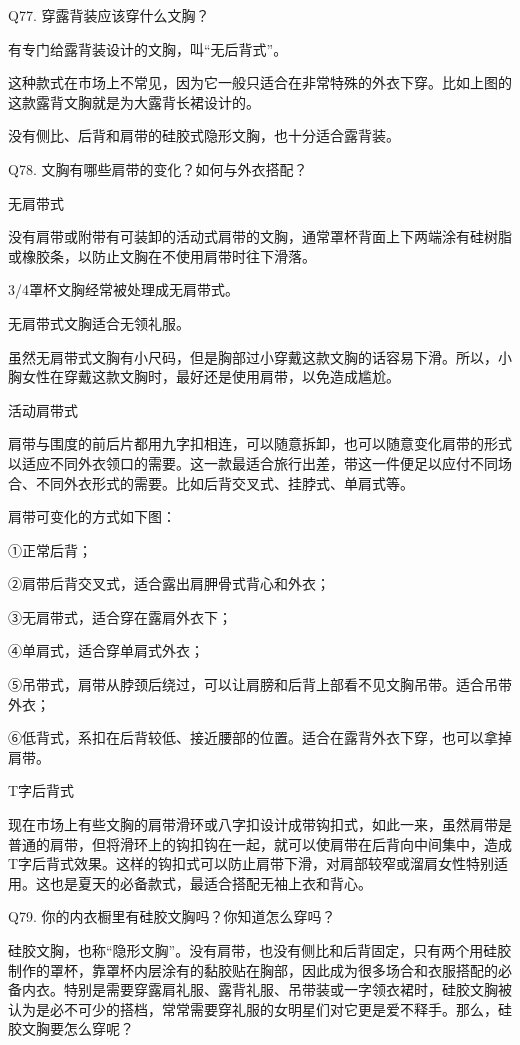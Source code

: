 \documentclass[12pt,UTF8]{ctexbook}
\begin{document}
Q77. 穿露背装应该穿什么文胸？


有专门给露背装设计的文胸，叫“无后背式”。



这种款式在市场上不常见，因为它一般只适合在非常特殊的外衣下穿。比如上图的这款露背文胸就是为大露背长裙设计的。

没有侧比、后背和肩带的硅胶式隐形文胸，也十分适合露背装。


Q78. 文胸有哪些肩带的变化？如何与外衣搭配？


无肩带式

没有肩带或附带有可装卸的活动式肩带的文胸，通常罩杯背面上下两端涂有硅树脂或橡胶条，以防止文胸在不使用肩带时往下滑落。

3/4罩杯文胸经常被处理成无肩带式。

无肩带式文胸适合无领礼服。

虽然无肩带式文胸有小尺码，但是胸部过小穿戴这款文胸的话容易下滑。所以，小胸女性在穿戴这款文胸时，最好还是使用肩带，以免造成尴尬。

活动肩带式

肩带与围度的前后片都用九字扣相连，可以随意拆卸，也可以随意变化肩带的形式以适应不同外衣领口的需要。这一款最适合旅行出差，带这一件便足以应付不同场合、不同外衣形式的需要。比如后背交叉式、挂脖式、单肩式等。

肩带可变化的方式如下图：

①正常后背；

②肩带后背交叉式，适合露出肩胛骨式背心和外衣；

③无肩带式，适合穿在露肩外衣下；

④单肩式，适合穿单肩式外衣；

⑤吊带式，肩带从脖颈后绕过，可以让肩膀和后背上部看不见文胸吊带。适合吊带外衣；

⑥低背式，系扣在后背较低、接近腰部的位置。适合在露背外衣下穿，也可以拿掉肩带。



T字后背式

现在市场上有些文胸的肩带滑环或八字扣设计成带钩扣式，如此一来，虽然肩带是普通的肩带，但将滑环上的钩扣钩在一起，就可以使肩带在后背向中间集中，造成T字后背式效果。这样的钩扣式可以防止肩带下滑，对肩部较窄或溜肩女性特别适用。这也是夏天的必备款式，最适合搭配无袖上衣和背心。





Q79. 你的内衣橱里有硅胶文胸吗？你知道怎么穿吗？


硅胶文胸，也称“隐形文胸”。没有肩带，也没有侧比和后背固定，只有两个用硅胶制作的罩杯，靠罩杯内层涂有的黏胶贴在胸部，因此成为很多场合和衣服搭配的必备内衣。特别是需要穿露肩礼服、露背礼服、吊带装或一字领衣裙时，硅胶文胸被认为是必不可少的搭档，常常需要穿礼服的女明星们对它更是爱不释手。那么，硅胶文胸要怎么穿呢？
\end{document}
